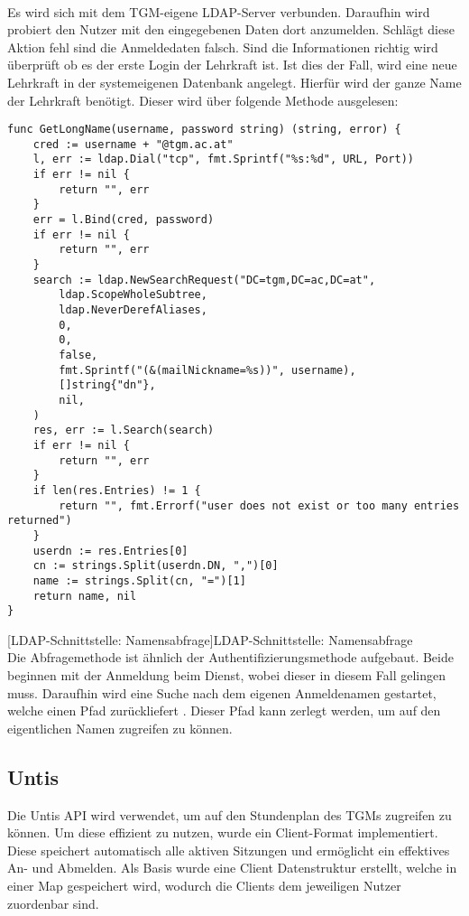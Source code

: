 ~\\
Es wird sich mit dem TGM-eigene LDAP-Server verbunden. Daraufhin wird probiert den Nutzer mit den eingegebenen Daten dort anzumelden. Schlägt diese Aktion fehl sind die Anmeldedaten falsch. Sind die Informationen richtig wird überprüft ob es der erste Login der Lehrkraft ist. Ist dies der Fall, wird eine neue Lehrkraft in der systemeigenen Datenbank angelegt. Hierfür wird der ganze Name der Lehrkraft benötigt. Dieser wird über folgende Methode ausgelesen:

\newpage

\begin{verbatim}
func GetLongName(username, password string) (string, error) {
	cred := username + "@tgm.ac.at"
	l, err := ldap.Dial("tcp", fmt.Sprintf("%s:%d", URL, Port))
	if err != nil {
		return "", err
	}
	err = l.Bind(cred, password)
	if err != nil {
		return "", err
	}
	search := ldap.NewSearchRequest("DC=tgm,DC=ac,DC=at",
		ldap.ScopeWholeSubtree,
		ldap.NeverDerefAliases,
		0,
		0,
		false,
		fmt.Sprintf("(&(mailNickname=%s))", username),
		[]string{"dn"},
		nil,
	)
	res, err := l.Search(search)
	if err != nil {
		return "", err
	}
	if len(res.Entries) != 1 {
		return "", fmt.Errorf("user does not exist or too many entries returned")
	}
	userdn := res.Entries[0]
	cn := strings.Split(userdn.DN, ",")[0]
	name := strings.Split(cn, "=")[1]
	return name, nil
}
\end{verbatim}
[LDAP-Schnittstelle: Namensabfrage]{LDAP-Schnittstelle: Namensabfrage \cite{go-ldap}}
~\\
Die Abfragemethode ist ähnlich der Authentifizierungsmethode aufgebaut. Beide beginnen mit der Anmeldung beim Dienst, wobei dieser in diesem Fall gelingen muss. Daraufhin wird eine Suche nach dem eigenen Anmeldenamen gestartet, welche einen Pfad zurückliefert \cite{go-ldap}. Dieser Pfad kann zerlegt werden, um auf den eigentlichen Namen zugreifen zu können.

\newpage

\subsection{Untis}

Die Untis API wird verwendet, um auf den Stundenplan des TGMs zugreifen zu können. \cite{untis} Um diese effizient zu nutzen, wurde ein Client-Format implementiert. Diese speichert automatisch alle aktiven Sitzungen und ermöglicht ein effektives An- und Abmelden. Als Basis wurde eine Client Datenstruktur erstellt, welche in einer Map gespeichert wird, wodurch die Clients dem jeweiligen Nutzer zuordenbar sind.


